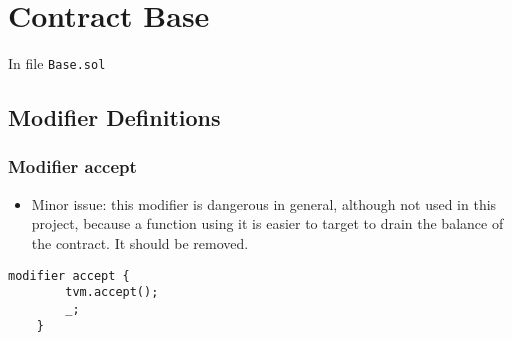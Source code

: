 
\chapter{Contract Base}

\minitoc

In file {\tt Base.sol}

\section{Modifier Definitions}

\subsection{Modifier accept}

\begin{itemize}
\item Minor issue: this modifier is dangerous in general, although not
  used in this project, because a function using it is easier to
  target to drain the balance of the contract. It should be removed.
\end{itemize}

\begin{lstlisting}[firstnumber=36]
    modifier accept {
        tvm.accept();
        _;
    }
\end{lstlisting}
